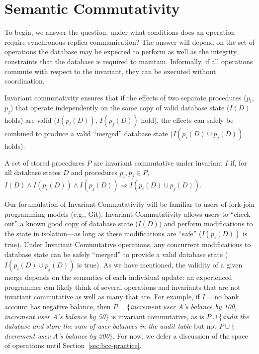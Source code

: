 
\section{Semantic Commutativity}
\label{sec:bcc-theory}

To begin, we answer the question: under what conditions does an
operation require synchronous replica communication? The answer will
depend on the set of operations the database may be expected to
perform as well as the integrity constraints that the database is
required to maintain. Informally, if all operations commute with
respect to the invariant, they can be executed without coordination.

Invariant commutativity ensures that if the effects of two separate
procedures ($p_i$, $p_j$) that operate independently on the same copy
of valid database state ($I(D)$ holds) are valid ($I(p_i(D))$,
$I(p_j(D))$ hold), the effects can safely be combined to produce a
valid ``merged'' database state ($I(p_i(D) \cup p_j(D))$ holds):

\begin{definition}
A set of stored procedures $P$ are invariant commutative under
invariant $I$ if, for all database states $D$ and procedures $p_i, p_j
\in P,$$ I(D) \wedge I(p_i(D)) \wedge I(p_j(D)) \Rightarrow I(p_i(D)
\cup p_j(D))$.
\end{definition}

Our forumulation of Invariant Commutativity will be familiar to users
of fork-join programming models (e.g., Git). Invariant Commutativity
allows users to ``check out'' a known good copy of database state
($I(D)$) and perform modifications to the state in isolation---as long
as these modifications are ``safe'' ($I(p_i(D))$ is true). Under
Invariant Commutative operations, any concurrent modifications to
database state can be safely ``merged'' to provide a valid database
state ($I(p_i(D) \cup p_j(D))$ is true). As we have mentioned, the
validity of a given merge depends on the semantics of each individual
update: an experienced programmer can likely think of several
operations and invariants that are not invariant commutative as well
as many that are. For example, if $I=$no bank account has negative
balance, then $P=\{$\textit{increment user A's balance by 100,
  increment user A's balance by 50}$\}$ is invariant commutative, as
is $P\cup\{$\textit{audit the database and store the sum of user
  balances in the \textrm{audit} table} but not
$P\cup\{$\textit{decrement user A's balance by 200}$\}$. For now, we
defer a discussion of the space of operations until
Section~\ref{sec:bcc-practice}.

